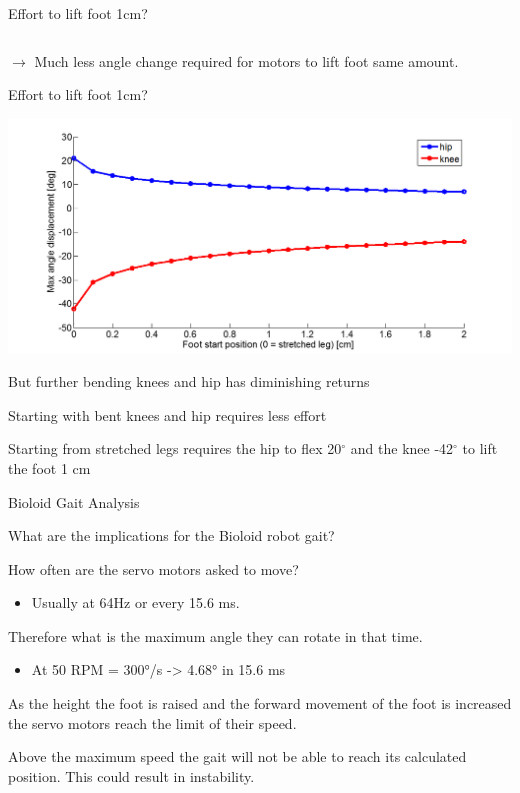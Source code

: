 \documentclass[compress]{beamer}
\begin{document}
\begin{frame}{Effort to lift foot 1cm?}
\begin{columns}
\begin{column}{0.5\linewidth}
        \end{column}
    \end{columns}

    $\rightarrow$ Much less angle change required for motors to lift foot same amount.

\end{frame}

\begin{frame}{Effort to lift foot 1cm?}

    \begin{center}
        \includegraphics[width=0.8\linewidth]{graph3}
    \end{center}

    But further bending knees and hip has diminishing returns

    Starting with bent knees and hip requires less effort

    Starting from stretched legs requires the hip to flex 20$^\circ$ and the knee
    -42$^\circ$ to lift the foot 1 cm

\end{frame}

\begin{frame}{Bioloid Gait Analysis}

    What are the implications for the Bioloid robot gait?

    How often are the servo motors asked to move?

    \begin{itemize}

        \item Usually at 64Hz or every 15.6 ms.
    \end{itemize}

    Therefore what is the maximum angle they can rotate in that time.

    \begin{itemize}

        \item At 50 RPM = 300°/s -\textgreater{} 4.68° in 15.6 ms
    \end{itemize}

    As the height the foot is raised and the forward movement of the foot is
    increased the servo motors reach the limit of their speed.

    Above the maximum speed the gait will not be able to reach its
    calculated position. This could result in instability.

\end{frame}
\end{document}
